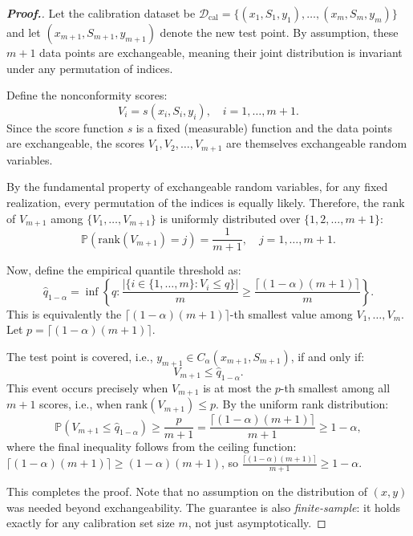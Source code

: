 \documentclass[12pt,a4paper,oneside]{report}
\theoremstyle{definition}
\theoremstyle{remark}
\begin{document}
\begin{proof}[\textbf{Proof.}]
Let the calibration dataset be $\mathcal{D}_{\text{cal}} = \{(x_1, S_1, y_1), \ldots, (x_m, S_m, y_m)\}$ and let $(x_{m+1}, S_{m+1}, y_{m+1})$ denote the new test point. By assumption, these $m+1$ data points are exchangeable, meaning their joint distribution is invariant under any permutation of indices.

Define the nonconformity scores:
\[
V_i = s(x_i, S_i, y_i), \quad i = 1, \ldots, m+1.
\]
Since the score function $s$ is a fixed (measurable) function and the data points are exchangeable, the scores $V_1, V_2, \ldots, V_{m+1}$ are themselves exchangeable random variables.

By the fundamental property of exchangeable random variables, for any fixed realization, every permutation of the indices is equally likely. Therefore, the rank of $V_{m+1}$ among $\{V_1, \ldots, V_{m+1}\}$ is uniformly distributed over $\{1, 2, \ldots, m+1\}$:
\[
\mathbb{P}\left(\text{rank}(V_{m+1}) = j\right) = \frac{1}{m+1}, \quad j = 1, \ldots, m+1.
\]

Now, define the empirical quantile threshold as:
\[
\hat{q}_{1-\alpha} = \inf\left\{q : \frac{|\{i \in \{1,\ldots,m\} : V_i \leq q\}|}{m} \geq \frac{\lceil(1-\alpha)(m+1)\rceil}{m}\right\}.
\]
This is equivalently the $\lceil(1-\alpha)(m+1)\rceil$-th smallest value among $V_1, \ldots, V_m$. Let $p = \lceil(1-\alpha)(m+1)\rceil$.

The test point is covered, i.e., $y_{m+1} \in C_{\alpha}(x_{m+1}, S_{m+1})$, if and only if:
\[
V_{m+1} \leq \hat{q}_{1-\alpha}.
\]
This event occurs precisely when $V_{m+1}$ is at most the $p$-th smallest among all $m+1$ scores, i.e., when $\text{rank}(V_{m+1}) \leq p$. By the uniform rank distribution:
\[
\mathbb{P}\left(V_{m+1} \leq \hat{q}_{1-\alpha}\right) \geq \frac{p}{m+1} = \frac{\lceil(1-\alpha)(m+1)\rceil}{m+1} \geq 1 - \alpha,
\]
where the final inequality follows from the ceiling function: $\lceil(1-\alpha)(m+1)\rceil \geq (1-\alpha)(m+1)$, so $\frac{\lceil(1-\alpha)(m+1)\rceil}{m+1} \geq 1-\alpha$.

This completes the proof. Note that no assumption on the distribution of $(x,y)$ was needed beyond exchangeability. The guarantee is also \emph{finite-sample}: it holds exactly for any calibration set size $m$, not just asymptotically.
\end{proof}
\end{document}
